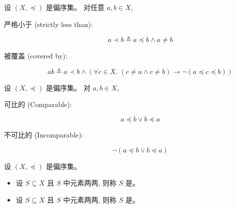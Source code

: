 \begin{frame}{}
  \begin{definition}
    设 $(X, \preceq)$ 是偏序集。
    对任意 $a, b \in X$,

    \begin{description}
      \item[严格小于 (strictly less than):]
        \[
          a \prec b \triangleq a \preceq b \land a \neq b
        \]
      \item[被覆盖 (covered by):]
        \[
          a b \triangleq a \prec b \land
            (\forall c \in X.\; (c \neq a \land c \neq b) \to \lnot (a \preceq c \preceq b))
        \]
    \end{description}
  \end{definition}

\end{frame}

\begin{frame}{}
  \begin{definition}
    设 $(X, \preceq)$ 是偏序集。
    对 $a, b \in X$,

    \begin{description}
      \item[可比的 (Comparable):]
        \[
          a \preceq b \lor b \preceq a
        \]
      \item[不可比的 (Incomparable):]
        \[
          \lnot(a \preceq b \lor b \preceq a)
        \]
    \end{description}
  \end{definition}

\end{frame}

\begin{frame}{}
  \begin{definition}
    设 $(X, \preceq)$ 是偏序集。

    \begin{itemize}
      \setlength{\itemsep}{6pt}
      \item 设 $S \subseteq X$ 且 $S$ 中元素两两, 则称 $S$ 是。
      \item 设 $S \subseteq X$ 且 $S$ 中元素两两, 则称 $S$ 是。
    \end{itemize}
  \end{definition}

\end{frame}

